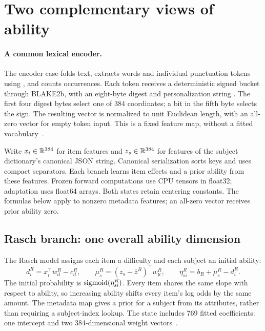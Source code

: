 \section{Two complementary views of ability}
\label{sec:models}
\paragraph{A common lexical encoder.}
The encoder case-folds text, extracts words and individual punctuation tokens using , and counts occurrences. Each token receives a deterministic signed bucket through BLAKE2b, with an eight-byte digest and personalization string . The first four digest bytes select one of 384 coordinates; a bit in the fifth byte selects the sign. The resulting vector is normalized to unit Euclidean length, with an all-zero vector for empty token input. This is a fixed feature map, without a fitted vocabulary~\citep{release,weinberger2009}.

Write $x_i\in\mathbb{R}^{384}$ for item features and $z_s\in\mathbb{R}^{384}$ for features of the subject dictionary's canonical JSON string. Canonical serialization sorts keys and uses compact separators. Each branch learns item effects and a prior ability from these features. Frozen forward computations use CPU tensors in float32; adaptation uses float64 arrays. Both states retain centering constants. The formulas below apply to nonzero metadata features; an all-zero vector receives prior ability zero.

\subsection{Rasch branch: one overall ability dimension}
The Rasch model assigns each item a difficulty and each subject an initial ability:
\begin{equation}
 d_i^{R}=x_i^\top w_d^{R}-c_d^{R},\qquad
 \mu_s^{R}=(z_s-\bar z^{R})^\top w_\mu^{R},\qquad
 \eta_{si}^{R}=b_R+\mu_s^{R}-d_i^{R}.
 \label{eq:rasch}
\end{equation}
The initial probability is $\operatorname{sigmoid}(\eta_{si}^{R})$. Every item shares the same slope with respect to ability, so increasing ability shifts every item's log odds by the same amount. The metadata map gives a prior for a subject from its attributes, rather than requiring a subject-index lookup. The state includes 769 fitted coefficients: one intercept and two 384-dimensional weight vectors~\citep{release}.

